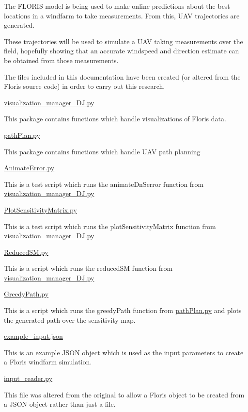 The F\+L\+O\+R\+IS model is being used to make online predictions about the best locations in a windfarm to take measurements. From this, U\+AV trajectories are generated.

These trajectories will be used to simulate a U\+AV taking measurements over the field, hopefully showing that an accurate windspeed and direction estimate can be obtained from those measurements.

The files included in this documentation have been created (or altered from the Floris source code) in order to carry out this research.

\mbox{\hyperlink{visualization__manager___d_j_8py}{visualization\+\_\+manager\+\_\+\+D\+J.\+py}}

This package contains functions which handle visualizations of Floris data.

\mbox{\hyperlink{path_plan_8py}{path\+Plan.\+py}}

This package contains functions which handle U\+AV path planning

\mbox{\hyperlink{_animate_error_8py}{Animate\+Error.\+py}}

This is a test script which runs the animate\+Dn\+Serror function from \mbox{\hyperlink{visualization__manager___d_j_8py}{visualization\+\_\+manager\+\_\+\+D\+J.\+py}}

\mbox{\hyperlink{_plot_sensitivity_matrix_8py}{Plot\+Sensitivity\+Matrix.\+py}}

This is a test script which runs the plot\+Sensitivity\+Matrix function from \mbox{\hyperlink{visualization__manager___d_j_8py}{visualization\+\_\+manager\+\_\+\+D\+J.\+py}}

\mbox{\hyperlink{_reduced_s_m_8py}{Reduced\+S\+M.\+py}}

This is a script which runs the reduced\+SM function from \mbox{\hyperlink{visualization__manager___d_j_8py}{visualization\+\_\+manager\+\_\+\+D\+J.\+py}}

\mbox{\hyperlink{_greedy_path_8py}{Greedy\+Path.\+py}}

This is a script which runs the greedy\+Path function from \mbox{\hyperlink{path_plan_8py}{path\+Plan.\+py}} and plots the generated path over the sensitivity map.

\mbox{\hyperlink{example__input_8json}{example\+\_\+input.\+json}}

This is an example J\+S\+ON object which is used as the input parameters to create a Floris windfarm simulation.

\mbox{\hyperlink{input__reader_8py}{input\+\_\+reader.\+py}}

This file was altered from the original to allow a Floris object to be created from a J\+S\+ON object rather than just a file. 